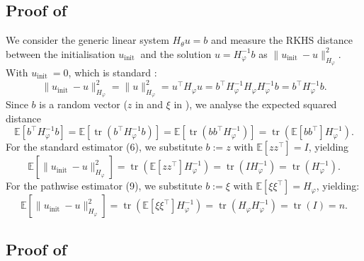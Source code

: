 \subsection{Proof of }
\label{app:proof_pathwise_dist}
We consider the generic linear system $H_\theta u=b$ and measure the RKHS distance between the initialisation $u_{\text {init }}$ and the solution $u=H_{\varphi}^{-1} b$ as $\|u_{\text {init }}-u\|_{H_{\varphi}}^2$. With $u_{\text {init }}=0$, which is standard \cite{gardner18,WangPGT2019exactgp,wu2024largescale}:
\[
\|u_{\text {init }}-u\|_{H_{\varphi}}^2=\|u\|_{H_{\varphi}}^2=u^{\top} H_{\varphi} u=b^{\top} H_{\varphi}^{-1} H_{\varphi} H_{\varphi}^{-1} b=b^{\top} H_{\varphi}^{-1} b \label{eq:RKHS_distance}.
\]
Since $b$ is a random vector ($z$ in  and $\xi$ in ), we analyse the expected squared distance
\[
\mathbb{E}\left[b^{\top} H_{\varphi}^{-1} b\right]=\mathbb{E}\left[\operatorname{tr}\left(b^{\top} H_{\varphi}^{-1} b\right)\right]=\mathbb{E}\left[\operatorname{tr}\left(b b^{\top} H_{\varphi}^{-1}\right)\right]=\operatorname{tr}\left(\mathbb{E}\left[b b^{\top}\right] H_{\varphi}^{-1}\right).
\]
For the standard estimator (6), we substitute $b:=z$ with $\mathbb{E}\left[z z^{\top}\right]=I$, yielding
\[
\mathbb{E}\left[\|u_{\text {init }}-u\|_{H_{\varphi}}^2\right]=\operatorname{tr}\left(\mathbb{E}\left[z z^{\top}\right] H_{\varphi}^{-1}\right)=\operatorname{tr}\left(I H_{\varphi}^{-1}\right)=\operatorname{tr}\left(H_{\varphi}^{-1}\right) . \label{eq:standard_dist_app}
\]
For the pathwise estimator (9), we substitute $b:=\xi$ with $\mathbb{E}\left[\xi \xi^{\top}\right]=H_{\varphi}$, yielding:
\[
\mathbb{E}\left[\|u_{\text {init }}-u\|_{H_{\varphi}}^2\right]=\operatorname{tr}\left(\mathbb{E}\left[\xi \xi^{\top}\right] H_{\varphi}^{-1}\right)=\operatorname{tr}\left(H_{\varphi} H_{\varphi}^{-1}\right)=\operatorname{tr}(I)=n . \label{eq:pathwise_dist_app}
\]

\subsection{Proof of }
\label{app:proof_mackay_first_order_solution}

